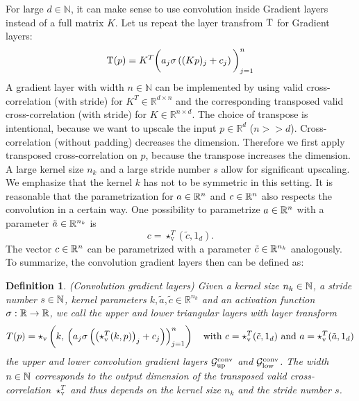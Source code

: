 \documentclass[twoside,a4paper]{article}
\newtheorem{definition}{Definition}
\begin{document}
For large $d \in \mathbb{N}$, it can make sense to use convolution inside Gradient layers 
instead of a full matrix $K$. Let us repeat the layer transfrom $\mathrm{T}$ for Gradient layers:
\begin{equation*}
	\mathrm{T}(p) = K^T \bigg( a_j \sigma \left( (Kp)_j + c_j \right) \bigg)_{j=1}^n
\end{equation*}
A gradient layer with width $n \in \mathbb{N}$ can be implemented by 
using valid cross-correlation (with stride) for $K^T \in \mathbb{R}^{d \times n}$ and the
corresponding transposed valid cross-correlation (with stride) for $K \in \mathbb{R}^{n \times d}$.
The choice of transpose is intentional, because we want to upscale the input $p \in \mathbb{R}^d$ ($n >> d$). 
Cross-correlation (without padding) decreases the dimension. Therefore we first apply 
transposed cross-correlation on $p$, because the transpose increases the dimension.
A large kernel size $n_k$ and a large stride number $s$ allow for significant upscaling.
We emphasize that the kernel $k$ has not to be symmetric in this setting. 
It is reasonable that the parametrization for $a \in \mathbb{R}^n$ and $c \in \mathbb{R}^n$ also respects
the convolution in a certain way.
One possibility to parametrize $a \in \mathbb{R}^n$ with a parameter $\tilde{a} \in \mathbb{R}^{n_k}$ is
\begin{equation*}
	c = \star_{\text{v}}^T(\tilde{c},1_d)
	.
\end{equation*}
The vector $c \in \mathbb{R}^n$ can be parametrized with a parameter $\tilde{c} \in \mathbb{R}^{n_k}$ analogously.
To summarize, the convolution gradient layers then can be defined as:
\begin{definition}
	(Convolution gradient layers)
	Given a kernel size $n_k \in \mathbb{N}$, a stride number $s \in \mathbb{N}$,
	kernel parameters $k,\tilde{a},\tilde{c} \in \mathbb{R}^{n_k}$ and
	an activation function $\sigma : \mathbb{R} \to \mathbb{R}$,
	we call the upper and lower triangular layers with layer transform
	\begin{equation*}
		T(p) = \star_{\text{v}} \left( k, \, \left( a_j \sigma \left( \left( \star_{\text{v}}^T(k,p) \right)_j + c_j \right) \right)_{j=1}^n \right) 
		\quad
		\text{with } c = \star_{\text{v}}^T(\tilde{c},1_d) 
		\text{ and } a = \star_{\text{v}}^T(\tilde{a},1_d)
	\end{equation*}
	the upper and lower convolution gradient layers 
	$\mathcal{G}_{\text{up}}^{\text{conv}}$ and $\mathcal{G}_{\text{low}}^{\text{conv}}$.
	The width $n \in \mathbb{N}$ corresponds to the output dimension of the transposed valid cross-correlation $\star_{\text{v}}^T$
	and thus depends on the kernel size $n_k$ and the stride number $s$.
\end{definition}
\end{document}
